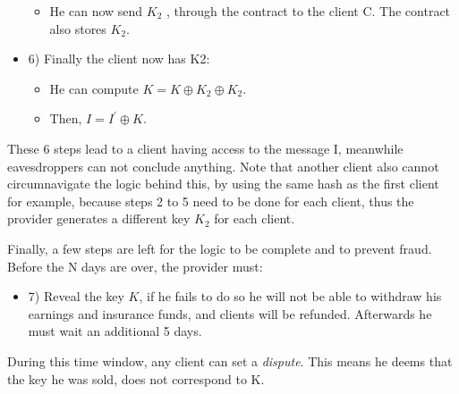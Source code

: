 \documentclass[conference]{IEEEtran}
\begin{document}
\begin{itemize}
    \begin{itemize}
        \item He can now send $K_2$ , through the contract to the client C. The contract also stores $K_2$.
    \end{itemize}
    \item 6) Finally the client now has K2:
    \begin{itemize}
        \item He can compute $ K = K \oplus K_2 \oplus K_2$.
        \item Then, $ I = I^{'} \oplus K$.
    \end{itemize}
\end{itemize}

These 6 steps lead to a client having access to the message I, meanwhile eavesdroppers can not conclude anything. Note that another client also cannot circumnavigate the logic behind this, by using the same hash as the first client for example, because steps 2 to 5 need to be done for each client, thus the provider generates a different key $K_2$ for each client.

Finally, a few steps are left for the logic to be complete and to prevent fraud. Before the N days are over, the provider must:
\begin{itemize}
    \item 7) Reveal the key $K$, if he fails to do so he will not be able to withdraw his earnings and insurance funds, and clients will be refunded. Afterwards he must wait an additional 5 days.
\end{itemize}
During this time window, any client can set a \textit{dispute}. This means he deems that the key he was sold, does not correspond to K. 
\end{document}
